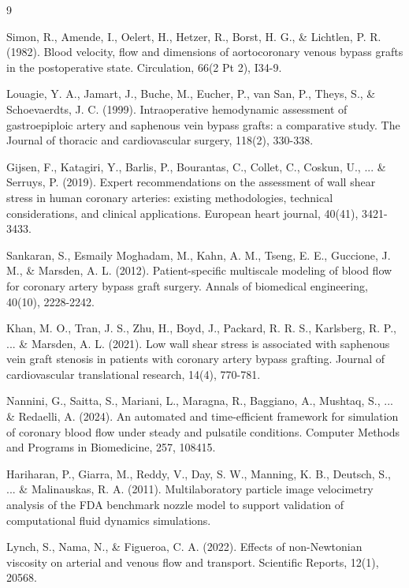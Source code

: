 \documentclass[11pt]{article}
\begin{document}

\begin{thebibliography}{9}

Simon, R., Amende, I., Oelert, H., Hetzer, R., Borst, H. G., \& Lichtlen, P. R. (1982). Blood velocity, flow and dimensions of aortocoronary venous bypass grafts in the postoperative state. Circulation, 66(2 Pt 2), I34-9.

Louagie, Y. A., Jamart, J., Buche, M., Eucher, P., van San, P., Theys, S., \& Schoevaerdts, J. C. (1999). Intraoperative hemodynamic assessment of gastroepiploic artery and saphenous vein bypass grafts: a comparative study. The Journal of thoracic and cardiovascular surgery, 118(2), 330-338.


Gijsen, F., Katagiri, Y., Barlis, P., Bourantas, C., Collet, C., Coskun, U., ... \& Serruys, P. (2019). Expert recommendations on the assessment of wall shear stress in human coronary arteries: existing methodologies, technical considerations, and clinical applications. European heart journal, 40(41), 3421-3433.

Sankaran, S., Esmaily Moghadam, M., Kahn, A. M., Tseng, E. E., Guccione, J. M., \& Marsden, A. L. (2012). Patient-specific multiscale modeling of blood flow for coronary artery bypass graft surgery. Annals of biomedical engineering, 40(10), 2228-2242.

Khan, M. O., Tran, J. S., Zhu, H., Boyd, J., Packard, R. R. S., Karlsberg, R. P., ... \& Marsden, A. L. (2021). Low wall shear stress is associated with saphenous vein graft stenosis in patients with coronary artery bypass grafting. Journal of cardiovascular translational research, 14(4), 770-781.

Nannini, G., Saitta, S., Mariani, L., Maragna, R., Baggiano, A., Mushtaq, S., ... \& Redaelli, A. (2024). An automated and time-efficient framework for simulation of coronary blood flow under steady and pulsatile conditions. Computer Methods and Programs in Biomedicine, 257, 108415.


Hariharan, P., Giarra, M., Reddy, V., Day, S. W., Manning, K. B., Deutsch, S., ... \& Malinauskas, R. A. (2011). Multilaboratory particle image velocimetry analysis of the FDA benchmark nozzle model to support validation of computational fluid dynamics simulations.



Lynch, S., Nama, N., \& Figueroa, C. A. (2022). Effects of non-Newtonian viscosity on arterial and venous flow and transport. Scientific Reports, 12(1), 20568.




\end{thebibliography}
\end{document}
